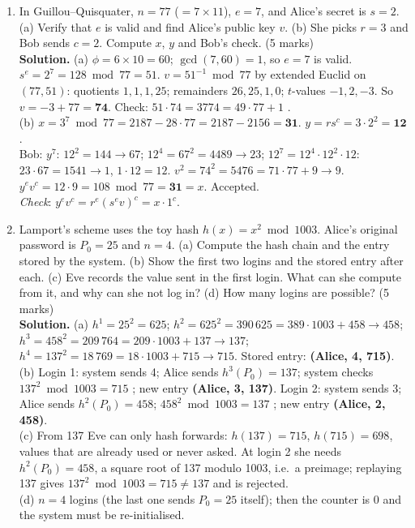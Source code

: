 \begin{enumerate}[leftmargin=1.6em,itemsep=4pt]
  \item In Guillou--Quisquater, $n = 77$ ($= 7 \times 11$), $e = 7$, and Alice's secret is $s = 2$. (a) Verify that $e$ is valid and find Alice's public key $v$. (b) She picks $r = 3$ and Bob sends $c = 2$. Compute $x$, $y$ and Bob's check. \hfill (5 marks)\\
  \textbf{Solution.} (a) $\phi = 6 \times 10 = 60$; $\gcd(7, 60) = 1$, so $e = 7$ is valid. $s^e = 2^7 = 128 \bmod 77 = 51$. $v = 51^{-1} \bmod 77$ by extended Euclid on $(77, 51)$: quotients $1, 1, 1, 25$; remainders $26, 25, 1, 0$; $t$-values $-1, 2, -3$. So $v = -3 + 77 = \mathbf{74}$. Check: $51 \cdot 74 = 3774 = 49 \cdot 77 + 1$ \checkmark.\\
  (b) $x = 3^7 \bmod 77 = 2187 - 28 \cdot 77 = 2187 - 2156 = \mathbf{31}$. $y = r s^c = 3 \cdot 2^2 = \mathbf{12}$.\\
  Bob: $y^7$: $12^2 = 144 \to 67$; $12^4 = 67^2 = 4489 \to 23$; $12^7 = 12^4 \cdot 12^2 \cdot 12$: $23 \cdot 67 = 1541 \to 1$, $1 \cdot 12 = 12$. $v^2 = 74^2 = 5476 = 71 \cdot 77 + 9 \to 9$. $y^e v^c = 12 \cdot 9 = 108 \bmod 77 = \mathbf{31} = x$. Accepted.\\
  \emph{Check}: $y^e v^c = r^e (s^e v)^c = x \cdot 1^c$.

  \item Lamport's scheme uses the toy hash $h(x) = x^2 \bmod 1003$. Alice's original password is $P_0 = 25$ and $n = 4$. (a) Compute the hash chain and the entry stored by the system. (b) Show the first two logins and the stored entry after each. (c) Eve records the value sent in the first login. What can she compute from it, and why can she not log in? (d) How many logins are possible? \hfill (5 marks)\\
  \textbf{Solution.} (a) $h^1 = 25^2 = 625$; $h^2 = 625^2 = 390\,625 = 389 \cdot 1003 + 458 \to 458$; $h^3 = 458^2 = 209\,764 = 209 \cdot 1003 + 137 \to 137$; $h^4 = 137^2 = 18\,769 = 18 \cdot 1003 + 715 \to 715$. Stored entry: \textbf{(Alice, 4, 715)}.\\
  (b) Login 1: system sends 4; Alice sends $h^3(P_0) = 137$; system checks $137^2 \bmod 1003 = 715$ \checkmark; new entry \textbf{(Alice, 3, 137)}. Login 2: system sends 3; Alice sends $h^2(P_0) = 458$; $458^2 \bmod 1003 = 137$ \checkmark; new entry \textbf{(Alice, 2, 458)}.\\
  (c) From 137 Eve can only hash forwards: $h(137) = 715$, $h(715) = 698$, values that are already used or never asked. At login 2 she needs $h^2(P_0) = 458$, a square root of 137 modulo 1003, i.e.\ a preimage; replaying 137 gives $137^2 \bmod 1003 = 715 \ne 137$ and is rejected.\\
  (d) $n = 4$ logins (the last one sends $P_0 = 25$ itself); then the counter is 0 and the system must be re-initialised.


\end{enumerate}
